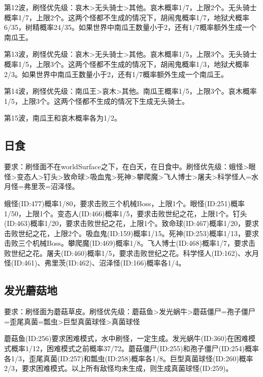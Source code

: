 第12波，刷怪优先级：哀木>无头骑士>其他。哀木概率1/7，上限2个。无头骑士概率1/7，上限2个。这两个怪都不生成的情况下，胡闹鬼概率1/7，地狱犬概率6/35，树精概率24/35。如果世界中南瓜王数量小于2，还有1/7概率额外生成一个南瓜王。

第13波，刷怪优先级：哀木>无头骑士>其他。哀木概率1/5，上限3个。无头骑士概率1/5，上限3个。这两个怪都不生成的情况下，胡闹鬼概率1/3，地狱犬概率2/3。如果世界中南瓜王数量小于2，还有1/7概率额外生成一个南瓜王。

第14波，刷怪优先级：南瓜王>哀木>其他。南瓜王概率1/5，上限3个。哀木概率1/5，上限3个。这两个怪都不生成的情况下生成无头骑士。

第15波，南瓜王和哀木概率各为1/2。

\subsection{日食}
要求：刷怪面不在worldSurface之下，在白天，在日食中。刷怪优先级：蛾怪>眼怪>变态人>钉头>致命球>吸血鬼>死神>攀爬魔>飞人博士>屠夫>科学怪人=水月怪=弗里茨=沼泽怪。

蛾怪(ID:477)概率1/80，要求击败三个机械Boss，上限1个。眼怪(ID:251)概率1/50，上限1个。变态人(ID:466)概率1/5，要求击败世纪之花，上限1个。钉头(ID:463)概率1/20，要求击败世纪之花，上限1个。致命球(ID:467)概率1/20，要求击败世纪之花，上限2个。吸血鬼(ID:159)概率1/15。死神(ID:253)概率1/13，要求击败三个机械Boss。攀爬魔(ID:469)概率1/8。飞人博士(ID:468)概率1/7，要求击败世纪之花。屠夫(ID:460)概率1/5，要求击败世纪之花。科学怪人(ID:162)、水月怪(ID:461)、弗里茨(ID:462)、沼泽怪(ID:166)概率各1/4。

\subsection{发光蘑菇地}
要求：刷怪面为蘑菇草皮。刷怪优先级：蘑菇鱼>发光蜗牛>蘑菇僵尸=孢子僵尸=歪尾真菌=瓢虫>巨型真菌球怪>真菌球怪

蘑菇鱼(ID:256)要求困难模式，水中刷怪，一定生成。发光蜗牛(ID:360)在困难模式概率1/12，困难模式之前概率37/72。蘑菇僵尸(ID:255)和孢子僵尸(ID:254)概率各1/3，歪尾真菌(ID:257)和瓢虫(ID:258)概率各1/8。巨型真菌球怪(ID:260)概率2/3，要求困难模式。以上所有敌怪均未生成，则生成真菌球怪(ID:259)。

